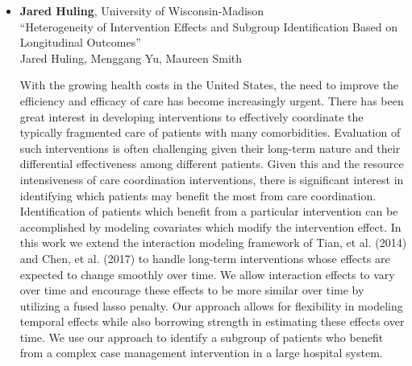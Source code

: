 \begin{itemize}
\item \textbf{Jared Huling}, University of Wisconsin-Madison \\
``Heterogeneity of Intervention Effects and Subgroup Identification Based on Longitudinal Outcomes'' \\
Jared Huling, Menggang Yu, Maureen Smith


With the growing health costs in the United States, the need to improve the efficiency and efficacy
of care has become increasingly urgent. There has been great interest in developing interventions to
effectively coordinate the typically fragmented care of  patients with many comorbidities. Evaluation
of such interventions is often challenging given their long-term nature and their differential effectiveness among different patients. Given this and the resource intensiveness of care coordination interventions, there is significant interest in identifying which patients may benefit the most from care coordination. Identification of patients which benefit from a particular intervention can be accomplished by modeling covariates which modify the intervention effect. In this work we extend the interaction modeling framework of Tian, et al. (2014) and Chen, et al. (2017) to handle long-term interventions whose effects are expected to change smoothly over time. We  allow interaction effects to vary over time and encourage these effects to be more similar over time by utilizing a fused lasso penalty. Our approach allows for flexibility in modeling temporal effects while also borrowing strength in estimating these effects over time. We use our approach to identify a subgroup of patients who benefit from a complex case management intervention in a large hospital system.

\end{itemize}

